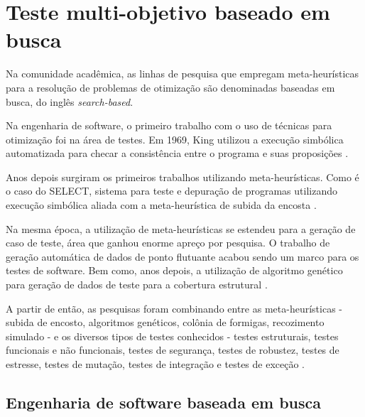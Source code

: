 \section{Teste multi-objetivo baseado em busca}

Na comunidade acadêmica, as linhas de pesquisa que empregam meta-heurísticas
para a resolução de problemas de otimização são denominadas baseadas em busca, do inglês \textit{search-based}.

Na engenharia de software, o primeiro trabalho com o uso de técnicas para
otimização foi na área de testes. Em 1969, King utilizou a execução simbólica
automatizada para checar a consistência entre o programa e suas proposições
\cite{king1969program}. 

Anos depois surgiram os primeiros trabalhos utilizando meta-heurísticas. Como é
o caso do SELECT, sistema para teste e depuração de programas utilizando
execução simbólica aliada com a meta-heurística de subida da encosta
\cite{boyer1975select}.


Na mesma época, a utilização de meta-heurísticas se estendeu para a geração de
caso de teste, área que ganhou enorme apreço por pesquisa. O trabalho de geração
automática de dados de ponto flutuante \cite{miller1976automatic} acabou sendo
um marco para os testes de software. Bem como, anos depois, a utilização de
algoritmo genético para geração de dados de teste para a cobertura estrutural
\cite{xanthakis1992application}.

A partir de então, as pesquisas foram combinando entre as meta-heurísticas -
subida de encosto, algoritmos genéticos, colônia de formigas, recozimento
simulado - e os diversos tipos de testes  conhecidos - testes estruturais,
testes funcionais e não funcionais, testes de segurança, testes de robustez,
testes de estresse, testes de mutação, testes de integração e testes de exceção
\cite{harman2009search}.

\subsection{Engenharia de software baseada em busca}

